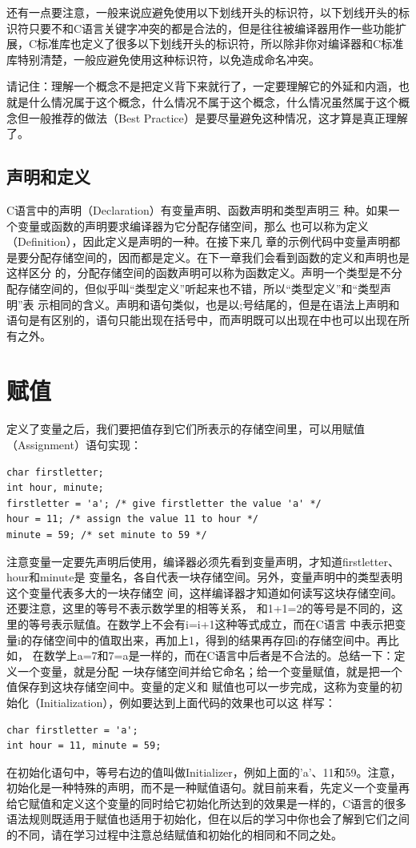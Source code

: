 \documentclass[12pt]{book}
\begin{document}
还有一点要注意，一般来说应避免使用以下划线开头的标识符，以下划线开头的标识符只要不和C语言关键字冲突的都是合法的，但是往往被编译器用作一些功能扩展，C标准库也定义了很多以下划线开头的标识符，所以除非你对编译器和C标准库特别清楚，一般应避免使用这种标识符，以免造成命名冲突。

请记住：理解一个概念不是把定义背下来就行了，一定要理解它的外延和内涵，也就是什么情况属于这个概念，什么情况不属于这个概念，什么情况虽然属于这个概念但一般推荐的做法（Best  Practice）是要尽量避免这种情况，这才算是真正理解了。



\subsection{声明和定义}
C语言中的声明（Declaration）有变量声明、函数声明和类型声明三
种。如果一个变量或函数的声明要求编译器为它分配存储空间，那么
也可以称为定义（Definition），因此定义是声明的一种。在接下来几
章的示例代码中变量声明都是要分配存储空间的，因而都是定义。在下一章我们会看到函数的定义和声明也是这样区分
的，分配存储空间的函数声明可以称为函数定义。声明一个类型是不分配存储空间的，但似乎叫“类型定义”听起来也不错，所以“类型定义”和“类型声明”表
示相同的含义。声明和语句类似，也是以;号结尾的，但是在语法上声明和语句是有区别的，语句只能出现在{}括号中，而声明既可以出现在{}中也可以出现在所有{}之外。

\section{赋值}
定义了变量之后，我们要把值存到它们所表示的存储空间里，可以用赋值（Assignment）语句实现：
\begin{verbatim}
char firstletter;
int hour, minute;
firstletter = 'a'; /* give firstletter the value 'a' */
hour = 11; /* assign the value 11 to hour */
minute = 59; /* set minute to 59 */
\end{verbatim}
注意变量一定要先声明后使用，编译器必须先看到变量声明，才知道firstletter、hour和minute是
变量名，各自代表一块存储空间。另外，变量声明中的类型表明这个变量代表多大的一块存储空
间，这样编译器才知道如何读写这块存储空间。还要注意，这里的等号不表示数学里的相等关系，
和1+1=2的等号是不同的，这里的等号表示赋值。在数学上不会有i=i+1这种等式成立，而在C语言
中表示把变量i的存储空间中的值取出来，再加上1，得到的结果再存回i的存储空间中。再比如，
在数学上a=7和7=a是一样的，而在C语言中后者是不合法的。总结一下：定义一个变量，就是分配
一块存储空间并给它命名；给一个变量赋值，就是把一个值保存到这块存储空间中。变量的定义和
赋值也可以一步完成，这称为变量的初始化（Initialization），例如要达到上面代码的效果也可以这
样写：
\begin{verbatim}
char firstletter = 'a';
int hour = 11, minute = 59;
\end{verbatim}
在初始化语句中，等号右边的值叫做Initializer，例如上面的'a'、11和59。注意，初始化是一种特殊的声明，而不是一种赋值语句。就目前来看，先定义一个变量再给它赋值和定义这个变量的同时给它初始化所达到的效果是一样的，C语言的很多语法规则既适用于赋值也适用于初始化，但在以后的学习中你也会了解到它们之间的不同，请在学习过程中注意总结赋值和初始化的相同和不同之处。
\end{document}
